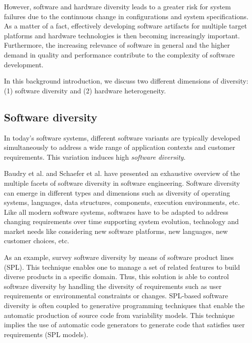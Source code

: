 However, software and hardware diversity leads to a greater risk for system failures due to the continuous change in configurations and system specifications.
As a matter of a fact, effectively developing software artifacts for multiple target platforms and hardware technologies is then becoming increasingly important.
Furthermore, the increasing relevance of software in general and the higher demand in quality and performance contribute to the complexity of software development.

In this background introduction, we discuss two different dimensions of diversity: (1) software diversity and (2) hardware heterogeneity.

 
 
\subsection{Software diversity}
In today's software systems, different software variants are typically developed simultaneously to address a wide range of application contexts and customer requirements\cite{schaefer2012software}. 
This variation induces high \textit{software diversity}. 

Baudry et al.\cite{baudry2015multiple} and Schaefer et al.\cite{schaefer2012software} have presented an exhaustive overview of the multiple facets of software diversity in software engineering. 
Software diversity can emerge in different types and dimensions such as diversity of operating systems, languages, data structures, components, execution environments, etc. 
Like all modern software systems, softwares have to be adapted to address changing requirements over time supporting system evolution, technology and market needs like considering new software platforms, new languages, new customer choices, etc.

As an example, \cite{schaefer2012software} survey software diversity by means of software product lines (SPL). This technique enables one to manage a set of related features to build diverse products in a specific domain. Thus, this solution is able to control software diversity by handling the diversity of requirements such as user requirements or environmental constraints or changes. SPL-based software diversity is often coupled to generative programming techniques\cite{Czarnecki:2000:GPM:345203} that enable the automatic production of source code from variability models. This technique implies the use of automatic code generators to generate code that satisfies user requirements (SPL models).

